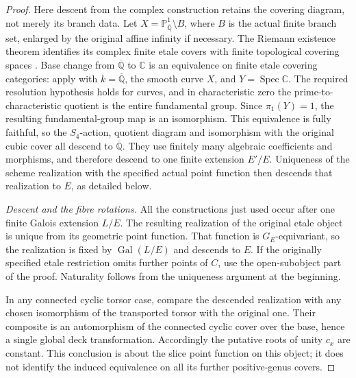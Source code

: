 \documentclass[11pt]{article}
\begin{document}
\begin{proof}
Here descent from the complex construction retains the
covering diagram, not merely its branch data. Let
\(X=\mathbb P^1_{\overline{\mathbb Q}}\setminus B\),
where \(B\) is the actual finite branch set, enlarged
by the original affine infinity if necessary. The
Riemann existence theorem identifies its complex finite
etale covers with finite topological covering spaces
\citep[Expose~XII, Theoreme~5.1]{FF_SGA1}.
Base change from \(\overline{\mathbb Q}\) to
\(\mathbb C\) is an equivalence on finite etale
covering categories: apply
\citet[Expose~XIII, Proposition~4.6(a)]{FF_SGA1}
with \(k=\overline{\mathbb Q}\), the smooth curve
\(X\), and \(Y=\operatorname{Spec}\mathbb C\).
The required resolution hypothesis holds for curves,
and in characteristic zero the prime-to-characteristic
quotient is the entire fundamental group. Since
\(\pi_1(Y)=1\), the resulting fundamental-group map
is an isomorphism. This equivalence is fully faithful,
so the \(S_4\)-action, quotient diagram and isomorphism
with the original cubic cover all descend to
\(\overline{\mathbb Q}\). They use finitely many
algebraic coefficients and morphisms, and therefore
descend to one finite extension \(E'/E\).
Uniqueness of the scheme realization with the specified
actual point function then descends that realization
to \(E\), as detailed below.

\emph{Descent and the fibre rotations.}
All the constructions just used occur after one finite
Galois extension \(L/E\). The resulting realization
of the original etale object is unique from its
geometric point function. That function is
\(G_E\)-equivariant, so the realization is fixed by
\(\operatorname{Gal}(L/E)\) and descends to \(E\).
If the originally specified etale restriction omits
further points of \(C\), use the open-subobject part
of the proof. Naturality follows from the uniqueness
argument at the beginning.

In any connected cyclic torsor case, compare the descended
realization with any chosen isomorphism of the
transported torsor with the original one. Their
composite is an automorphism of the connected cyclic
cover over the base, hence a single global deck
transformation. Accordingly the putative roots of unity
\(c_x\) are constant. This conclusion is about
the slice point function on this object; it does not
identify the induced equivalence on all its further
positive-genus covers.
\end{proof}
\end{document}
